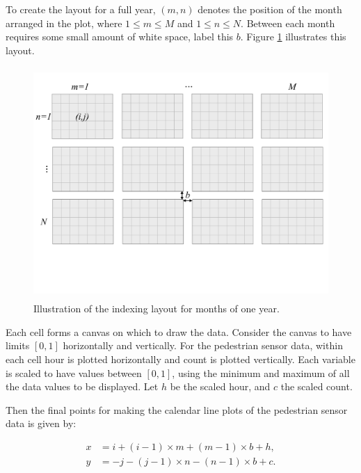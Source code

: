 \documentclass[article]{jss}
\begin{document}
To create the layout for a full year, \((m, n)\) denotes the position of
the month arranged in the plot, where \(1 \le m \le M\) and
\(1 \le n \le N\). Between each month requires some small amount of
white space, label this \(b\). Figure \ref{fig:year-diagram} illustrates
this layout.

\begin{CodeChunk}
\begin{figure}

{\centering \includegraphics[width=360pt,height=250pt]{figure/year} 

}

\caption[Illustration of the indexing layout for months of one year]{Illustration of the indexing layout for months of one year.}\label{fig:year-diagram}
\end{figure}
\end{CodeChunk}

Each cell forms a canvas on which to draw the data. Consider the canvas
to have limits \([0, 1]\) horizontally and vertically. For the
pedestrian sensor data, within each cell hour is plotted horizontally
and count is plotted vertically. Each variable is scaled to have values
between \([0,1]\), using the minimum and maximum of all the data values
to be displayed. Let \(h\) be the scaled hour, and \(c\) the scaled
count.

Then the final points for making the calendar line plots of the
pedestrian sensor data is given by:

\begin{equation}
  \begin{aligned}
  x &= i + (i - 1) \times m + (m - 1) \times b + h, \\
  y &= -j - (j - 1) \times n - (n - 1) \times b + c. \label{eq:final}
  \end{aligned}
\end{equation}
\end{document}
